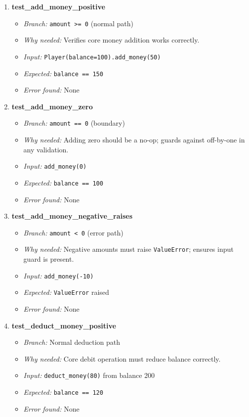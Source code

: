 \documentclass{article}
\begin{document}
\begin{enumerate}[label=\textbf{TC\arabic*.}]

  \item \textbf{test\_add\_money\_positive}
  \begin{itemize}[noitemsep]
    \item \textit{Branch:} \texttt{amount >= 0} (normal path)
    \item \textit{Why needed:} Verifies core money addition works correctly.
    \item \textit{Input:} \texttt{Player(balance=100).add\_money(50)}
    \item \textit{Expected:} \texttt{balance == 150}
    \item \textit{Error found:} None
  \end{itemize}

  \item \textbf{test\_add\_money\_zero}
  \begin{itemize}[noitemsep]
    \item \textit{Branch:} \texttt{amount == 0} (boundary)
    \item \textit{Why needed:} Adding zero should be a no-op; guards against off-by-one in any validation.
    \item \textit{Input:} \texttt{add\_money(0)}
    \item \textit{Expected:} \texttt{balance == 100}
    \item \textit{Error found:} None
  \end{itemize}

  \item \textbf{test\_add\_money\_negative\_raises}
  \begin{itemize}[noitemsep]
    \item \textit{Branch:} \texttt{amount < 0} (error path)
    \item \textit{Why needed:} Negative amounts must raise \texttt{ValueError}; ensures input guard is present.
    \item \textit{Input:} \texttt{add\_money(-10)}
    \item \textit{Expected:} \texttt{ValueError} raised
    \item \textit{Error found:} None
  \end{itemize}

  \item \textbf{test\_deduct\_money\_positive}
  \begin{itemize}[noitemsep]
    \item \textit{Branch:} Normal deduction path
    \item \textit{Why needed:} Core debit operation must reduce balance correctly.
    \item \textit{Input:} \texttt{deduct\_money(80)} from balance 200
    \item \textit{Expected:} \texttt{balance == 120}
    \item \textit{Error found:} None
  \end{itemize}


\end{enumerate}
\end{document}
